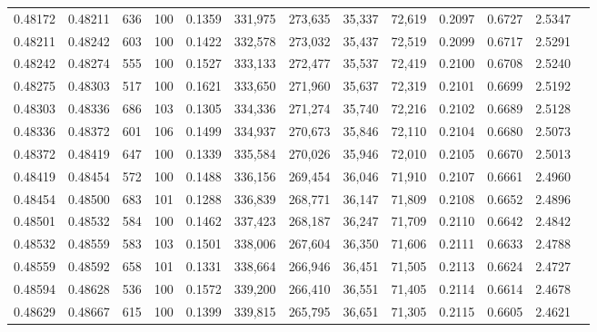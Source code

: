 \begin{tabular}{rrrrrrrrrrrrr}
0.48172 & 0.48211 &   636 & 100 &                                     0.1359 & 331,975 & 273,635 &  35,337 &  72,619 & 0.2097 & 0.6727 & 2.5347 \\
0.48211 & 0.48242 &   603 & 100 &                                     0.1422 & 332,578 & 273,032 &  35,437 &  72,519 & 0.2099 & 0.6717 & 2.5291 \\
0.48242 & 0.48274 &   555 & 100 &                                     0.1527 & 333,133 & 272,477 &  35,537 &  72,419 & 0.2100 & 0.6708 & 2.5240 \\
0.48275 & 0.48303 &   517 & 100 &                                     0.1621 & 333,650 & 271,960 &  35,637 &  72,319 & 0.2101 & 0.6699 & 2.5192 \\
0.48303 & 0.48336 &   686 & 103 &                                     0.1305 & 334,336 & 271,274 &  35,740 &  72,216 & 0.2102 & 0.6689 & 2.5128 \\
0.48336 & 0.48372 &   601 & 106 &                                     0.1499 & 334,937 & 270,673 &  35,846 &  72,110 & 0.2104 & 0.6680 & 2.5073 \\
0.48372 & 0.48419 &   647 & 100 &                                     0.1339 & 335,584 & 270,026 &  35,946 &  72,010 & 0.2105 & 0.6670 & 2.5013 \\
0.48419 & 0.48454 &   572 & 100 &                                     0.1488 & 336,156 & 269,454 &  36,046 &  71,910 & 0.2107 & 0.6661 & 2.4960 \\
0.48454 & 0.48500 &   683 & 101 &                                     0.1288 & 336,839 & 268,771 &  36,147 &  71,809 & 0.2108 & 0.6652 & 2.4896 \\
0.48501 & 0.48532 &   584 & 100 &                                     0.1462 & 337,423 & 268,187 &  36,247 &  71,709 & 0.2110 & 0.6642 & 2.4842 \\
0.48532 & 0.48559 &   583 & 103 &                                     0.1501 & 338,006 & 267,604 &  36,350 &  71,606 & 0.2111 & 0.6633 & 2.4788 \\
0.48559 & 0.48592 &   658 & 101 &                                     0.1331 & 338,664 & 266,946 &  36,451 &  71,505 & 0.2113 & 0.6624 & 2.4727 \\
0.48594 & 0.48628 &   536 & 100 &                                     0.1572 & 339,200 & 266,410 &  36,551 &  71,405 & 0.2114 & 0.6614 & 2.4678 \\
0.48629 & 0.48667 &   615 & 100 &                                     0.1399 & 339,815 & 265,795 &  36,651 &  71,305 & 0.2115 & 0.6605 & 2.4621 \\

\end{tabular}
